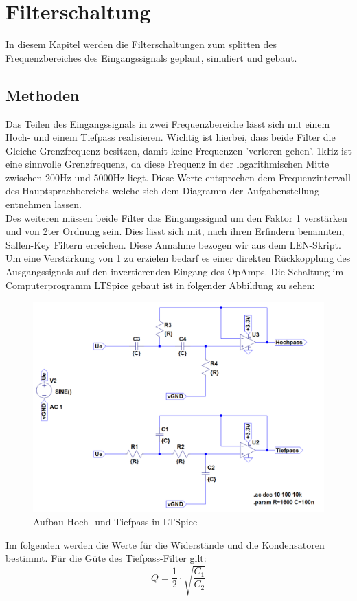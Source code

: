 \section{Filterschaltung}
In diesem Kapitel werden die Filterschaltungen zum splitten des Frequenzbereiches des Eingangssignals geplant, simuliert und gebaut.

\subsection{Methoden}
Das Teilen des Eingangssignals in zwei Frequenzbereiche lässt sich mit einem Hoch- und einem Tiefpass realisieren. Wichtig ist hierbei, dass beide Filter die Gleiche Grenzfrequenz besitzen, damit keine Frequenzen 'verloren gehen'. 1kHz ist eine sinnvolle Grenzfrequenz, da diese Frequenz in der logarithmischen Mitte zwischen 200Hz und 5000Hz liegt. Diese Werte entsprechen dem Frequenzintervall des Hauptsprachbereichs welche sich dem Diagramm\cite{Hoerbereichdiagramm} der Aufgabenstellung entnehmen lassen. \\
Des weiteren müssen beide Filter das Eingangssignal um den Faktor 1 verstärken und von 2ter Ordnung sein. Dies lässt sich mit, nach ihren Erfindern benannten, Sallen-Key Filtern erreichen.
Diese Annahme bezogen wir aus dem LEN-Skript.\\
Um eine Verstärkung von 1 zu erzielen bedarf es einer direkten Rückkopplung des Ausgangssignals auf den invertierenden Eingang des OpAmps. Die Schaltung im Computerprogramm LTSpice gebaut ist in folgender Abbildung zu sehen:
\begin{figure}[H]
	\centering
	\includegraphics[width=1\textwidth]{pics/SpiceSchaltungFilter.PNG}
	\caption{Aufbau Hoch- und Tiefpass in LTSpice}
\end{figure}
Im folgenden werden die Werte für die Widerstände und die Kondensatoren bestimmt.
Für die Güte des Tiefpass-Filter gilt:
$$ Q = \frac{1}{2}\cdot\sqrt{\frac{C_{1}}{C_{2}}} $$

